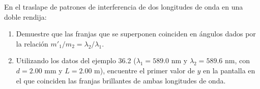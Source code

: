\item En el traslape de patrones de interferencia de dos longitudes de onda en una doble rendija:
\begin{enumerate}
    \item Demuestre que las franjas que se superponen coinciden en ángulos dados por la relación $m'_1/m_2 = \lambda_2/\lambda_1$.
    \item Utilizando los datos del ejemplo 36.2 ($\lambda_1 = 589.0\text{ nm}$ y $\lambda_2 = 589.6\text{ nm}$, con $d = 2.00\text{ mm}$ y $L = 2.00\text{ m}$), encuentre el primer valor de $y$ en la pantalla en el que coinciden las franjas brillantes de ambas longitudes de onda.
\end{enumerate}